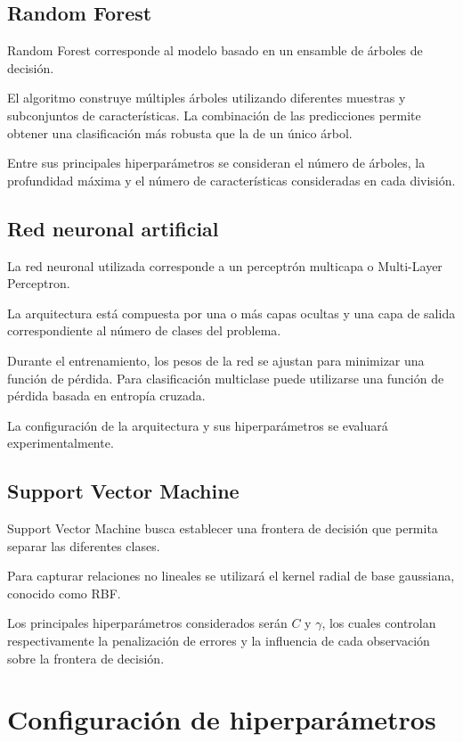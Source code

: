 \documentclass[conference]{IEEEtran}
\begin{document}
\subsection{Random Forest}

Random Forest corresponde al modelo basado en un ensamble de árboles de decisión.

El algoritmo construye múltiples árboles utilizando diferentes muestras y subconjuntos de características. La combinación de las predicciones permite obtener una clasificación más robusta que la de un único árbol.

Entre sus principales hiperparámetros se consideran el número de árboles, la profundidad máxima y el número de características consideradas en cada división.


\subsection{Red neuronal artificial}

La red neuronal utilizada corresponde a un perceptrón multicapa o Multi-Layer Perceptron.

La arquitectura está compuesta por una o más capas ocultas y una capa de salida correspondiente al número de clases del problema.

Durante el entrenamiento, los pesos de la red se ajustan para minimizar una función de pérdida. Para clasificación multiclase puede utilizarse una función de pérdida basada en entropía cruzada.

La configuración de la arquitectura y sus hiperparámetros se evaluará experimentalmente.


\subsection{Support Vector Machine}

Support Vector Machine busca establecer una frontera de decisión que permita separar las diferentes clases.

Para capturar relaciones no lineales se utilizará el kernel radial de base gaussiana, conocido como RBF.

Los principales hiperparámetros considerados serán $C$ y $\gamma$, los cuales controlan respectivamente la penalización de errores y la influencia de cada observación sobre la frontera de decisión.


\section{Configuración de hiperparámetros}
\end{document}
